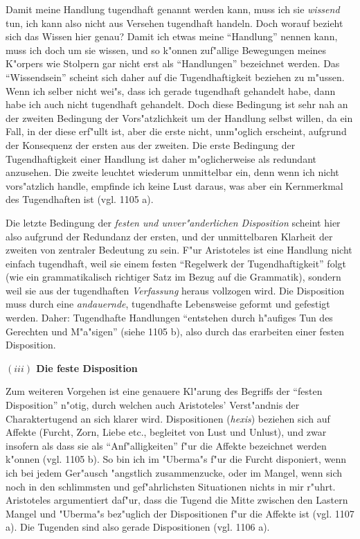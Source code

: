 \documentclass[a4paper, emulatestandardclasses, 12pt]{scrartcl}
\begin{document}
\begin{onehalfspace}
Damit meine Handlung tugendhaft genannt werden kann, muss ich sie \emph{wissend} tun, ich kann also nicht aus Versehen tugendhaft handeln. Doch worauf bezieht sich das Wissen hier genau? Damit ich etwas meine "`Handlung"' nennen kann, muss ich doch um sie wissen, und so k"onnen zuf"allige Bewegungen meines K"orpers wie Stolpern gar nicht erst als "`Handlungen"' bezeichnet werden. Das "`Wissendsein"' scheint sich daher auf die Tugendhaftigkeit beziehen zu m"ussen. Wenn ich selber nicht wei"s, dass ich gerade tugendhaft gehandelt habe, dann habe ich auch nicht tugendhaft gehandelt. Doch diese Bedingung ist sehr nah an der zweiten Bedingung der Vors"atzlichkeit um der Handlung selbst willen, da ein Fall, in der diese erf"ullt ist, aber die erste nicht, unm"oglich erscheint, aufgrund der Konsequenz der ersten aus der zweiten. Die erste Bedingung der Tugendhaftigkeit einer Handlung ist daher m"oglicherweise als redundant anzusehen. Die zweite leuchtet wiederum unmittelbar ein, denn wenn ich nicht vors"atzlich handle, empfinde ich keine Lust daraus, was aber ein Kernmerkmal des Tugendhaften ist (vgl. 1105 a). 

Die letzte Bedingung der \emph{festen und unver"anderlichen Disposition} scheint hier also aufgrund der Redundanz der ersten, und der unmittelbaren Klarheit der zweiten von zentraler Bedeutung zu sein. F"ur Aristoteles ist eine Handlung nicht einfach tugendhaft, weil sie einem festen "`Regelwerk der Tugendhaftigkeit"' folgt (wie ein grammatikalisch richtiger Satz im Bezug auf die Grammatik), sondern weil sie aus der tugendhaften \emph{Verfassung} heraus vollzogen wird. Die Disposition muss durch eine \emph{andauernde}, tugendhafte Lebensweise geformt und gefestigt werden. Daher: Tugendhafte Handlungen "`entstehen durch h"aufiges Tun des Gerechten und M"a"sigen"' (siehe 1105 b), also durch das erarbeiten einer festen Disposition.

\vspace{6mm}
\noindent\textbf{$(iii)$ Die feste Disposition}	

\noindent Zum weiteren Vorgehen ist eine genauere Kl"arung des Begriffs der "`festen Disposition"' n"otig, durch welchen auch Aristoteles' Verst"andnis der Charaktertugend an sich klarer wird. Dispositionen (\emph{hexis}) beziehen sich auf Affekte (Furcht, Zorn, Liebe etc., begleitet von Lust und Unlust), und zwar insofern als dass sie als "`Anf"alligkeiten"' f"ur die Affekte bezeichnet werden k"onnen (vgl. 1105 b). So bin ich im "Uberma"s f"ur die Furcht disponiert, wenn ich bei jedem Ger"ausch "angstlich zusammenzucke, oder im Mangel, wenn sich noch in den schlimmsten und gef"ahrlichsten Situationen nichts in mir r"uhrt. Aristoteles argumentiert daf"ur, dass die Tugend die Mitte zwischen den Lastern Mangel und "Uberma"s bez"uglich der Dispositionen f"ur die Affekte ist (vgl. 1107 a). Die Tugenden sind also gerade Dispositionen (vgl. 1106 a).


\end{onehalfspace}
\end{document}
